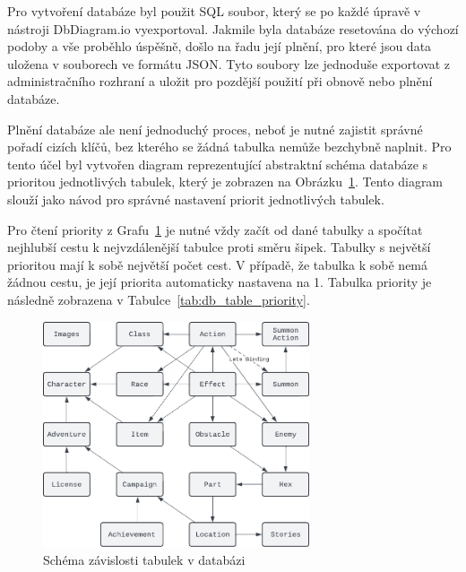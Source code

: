 Pro vytvoření databáze byl použit SQL soubor, který se po každé úpravě v nástroji DbDiagram.io vyexportoval. Jakmile byla databáze resetována do výchozí podoby a vše proběhlo úspěšně, došlo na řadu její plnění, pro které jsou data uložena v souborech ve formátu JSON. Tyto soubory lze jednoduše exportovat z administračního rozhraní a uložit pro pozdější použití při obnově nebo plnění databáze.

Plnění databáze ale není jednoduchý proces, neboť je nutné zajistit správné pořadí cizích klíčů, bez kterého se žádná tabulka nemůže bezchybně naplnit. Pro tento účel byl vytvořen diagram reprezentující abstraktní schéma databáze s prioritou jednotlivých tabulek, který je zobrazen na Obrázku~\ref{fig:db_table_priority}. Tento diagram slouží jako návod pro správné nastavení priorit jednotlivých tabulek.

Pro čtení priority z Grafu~\ref{fig:db_table_priority} je nutné vždy začít od dané tabulky a spočítat nejhlubší cestu k nejvzdálenější tabulce proti směru šipek. Tabulky s největší prioritou mají k sobě největší počet cest. V případě, že tabulka k sobě nemá žádnou cestu, je její priorita automaticky nastavena na 1. Tabulka priority je následně zobrazena v Tabulce~\ref{tab:db_table_priority}.

\begin{figure}[H]
    \centering
    \includegraphics[width=0.7\textwidth]{diagrams/databasePriority}
    \caption{Schéma závislosti tabulek v databázi}
    \label{fig:db_table_priority}
\end{figure}

